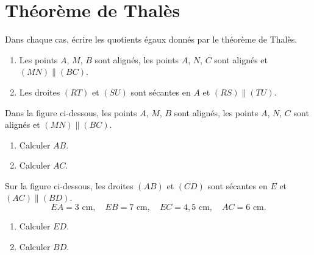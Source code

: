 \documentclass[a4paper,10pt]{report}
\begin{document}
\pagestyle{empty}
\section*{Théorème de Thalès}

\begin{ex}
Dans chaque cas, écrire les quotients égaux donnés par le théorème de Thalès.
\begin{enumerate}
\item Les points $A$, $M$, $B$ sont alignés, les points $A$, $N$, $C$ sont alignés et $(MN)\parallel(BC)$.
\item Les droites $(RT)$ et $(SU)$ sont sécantes en $A$ et $(RS)\parallel(TU)$.
\end{enumerate}
\end{ex}

\begin{ex}
Dans la figure ci-dessous, les points $A$, $M$, $B$ sont alignés, les points $A$, $N$, $C$ sont alignés et $(MN)\parallel(BC)$.

\begin{center}
\end{center}

\begin{enumerate}
\item Calculer $AB$.
\item Calculer $AC$.
\end{enumerate}
\end{ex}

\begin{ex}
Sur la figure ci-dessous, les droites $(AB)$ et $(CD)$ sont sécantes en $E$ et $(AC)\parallel(BD)$.
\[
EA=3\text{ cm},\quad EB=7\text{ cm},\quad EC=4,5\text{ cm},\quad AC=6\text{ cm}.
\]
\begin{enumerate}
\item Calculer $ED$.
\item Calculer $BD$.
\end{enumerate}
\end{ex}
\end{document}
